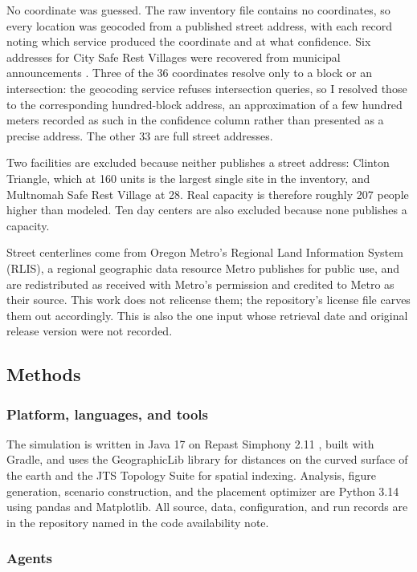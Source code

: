 \documentclass[graybox]{svmult}
\begin{document}
No coordinate was guessed. The raw inventory file contains no coordinates, so
every location was geocoded from a published street address, with each record
noting which service produced the coordinate and at what confidence. Six
addresses for City Safe Rest Villages were recovered from municipal
announcements \cite{portlandsrv}. Three of the 36 coordinates resolve only to a
block or an intersection: the geocoding service refuses intersection queries, so
I resolved those to the corresponding hundred-block address, an approximation of
a few hundred meters recorded as such in the confidence column rather than
presented as a precise address. The other 33 are full street addresses.

Two facilities are excluded because neither publishes a street address: Clinton
Triangle, which at 160 units is the largest single site in the inventory, and
Multnomah Safe Rest Village at 28. Real capacity is therefore roughly 207 people
higher than modeled. Ten day centers are also excluded because none publishes a
capacity.

Street centerlines come from Oregon Metro's Regional Land Information System
(RLIS), a regional geographic data resource Metro publishes for public use, and
are redistributed as received with Metro's permission and credited to Metro as
their source. This work does not relicense them; the repository's license file
carves them out accordingly. This is also the one input whose retrieval date and
original release version were not recorded.

\subsection{Methods}
\label{sec:methods}

\subsubsection{Platform, languages, and tools}
\label{sec:platform}

The simulation is written in Java 17 on Repast Simphony 2.11 \cite{north2013},
built with Gradle, and uses the GeographicLib library for distances on the curved
surface of the earth and the JTS Topology Suite for spatial indexing. Analysis,
figure generation, scenario construction, and the placement optimizer are Python
3.14 using pandas and Matplotlib. All source, data, configuration, and run
records are in the repository named in the code availability note.

\subsubsection{Agents}
\label{sec:agents}
\end{document}
